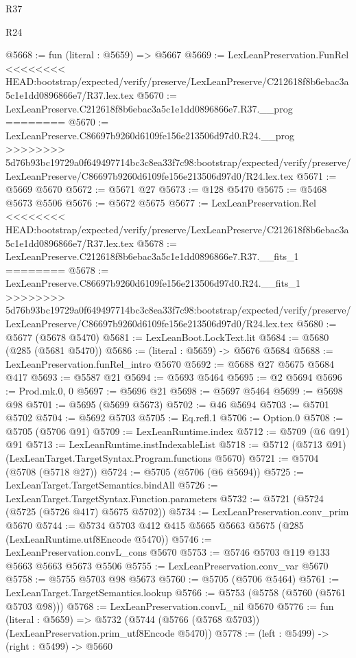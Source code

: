 \begin{lexlean}{R37}
\begin{lexlean}{R24}
\begin{coremodule}
{{{{{{{{{{{{{{{{{{{{{{{{{{{{{{{{{{{{{{{{{{{{{{{{{{{{{{{{{{{{{{{{{{{{{{{{{{{{{{{{{{{{{{{{{{{{{{{{{{{{{{{{{{{{{{{{{{{{{{{{{{{{{{{{{{{{{{{{{{{{{{{{{{{{{{{{{{{{{{{{{{{{{{{{{{{{{{{{{{{{{{{{{@5668 := fun (literal : @5659) => @5667
@5669 := LexLeanPreservation.FunRel
<<<<<<<< HEAD:bootstrap/expected/verify/preserve/LexLeanPreserve/C212618f8b6ebac3a5c1e1dd0896866e7/R37.lex.tex
@5670 := LexLeanPreserve.C212618f8b6ebac3a5c1e1dd0896866e7.R37.__prog
========
@5670 := LexLeanPreserve.C86697b9260d6109fe156e213506d97d0.R24.__prog
>>>>>>>> 5d76b93bc19729a0f649497714bc3c8ea33f7c98:bootstrap/expected/verify/preserve/LexLeanPreserve/C86697b9260d6109fe156e213506d97d0/R24.lex.tex
@5671 := @5669 @5670
@5672 := @5671 @27
@5673 := @128 @5470
@5675 := @5468 @5673 @5506
@5676 := @5672 @5675
@5677 := LexLeanPreservation.Rel
<<<<<<<< HEAD:bootstrap/expected/verify/preserve/LexLeanPreserve/C212618f8b6ebac3a5c1e1dd0896866e7/R37.lex.tex
@5678 := LexLeanPreserve.C212618f8b6ebac3a5c1e1dd0896866e7.R37.__fits_1
========
@5678 := LexLeanPreserve.C86697b9260d6109fe156e213506d97d0.R24.__fits_1
>>>>>>>> 5d76b93bc19729a0f649497714bc3c8ea33f7c98:bootstrap/expected/verify/preserve/LexLeanPreserve/C86697b9260d6109fe156e213506d97d0/R24.lex.tex
@5680 := @5677 (@5678 @5470)
@5681 := LexLeanBoot.LockText.lit
@5684 := @5680 (@285 (@5681 @5470))
@5686 := (literal : @5659) -> @5676 @5684
@5688 := LexLeanPreservation.funRel_intro @5670
@5692 := @5688 @27 @5675 @5684 @417
@5693 := @5587 @21
@5694 := @5693 @5464
@5695 := @2 @5694
@5696 := Prod.mk.{0, 0}
@5697 := @5696 @21
@5698 := @5697 @5464
@5699 := @5698 @98
@5701 := @5695 (@5699 @5673)
@5702 := @46 @5694
@5703 := @5701 @5702
@5704 := @5692 @5703
@5705 := Eq.refl.{1}
@5706 := Option.{0}
@5708 := @5705 (@5706 @91)
@5709 := LexLeanRuntime.index
@5712 := @5709 (@6 @91) @91
@5713 := LexLeanRuntime.instIndexableList
@5718 := @5712 (@5713 @91) (LexLeanTarget.TargetSyntax.Program.functions @5670)
@5721 := @5704 (@5708 (@5718 @27))
@5724 := @5705 (@5706 (@6 @5694))
@5725 := LexLeanTarget.TargetSemantics.bindAll
@5726 := LexLeanTarget.TargetSyntax.Function.parameters
@5732 := @5721 (@5724 (@5725 (@5726 @417) @5675 @5702))
@5734 := LexLeanPreservation.conv_prim @5670
@5744 := @5734 @5703 @412 @415 @5665 @5663 @5675 (@285 (LexLeanRuntime.utf8Encode @5470))
@5746 := LexLeanPreservation.convL_cons @5670
@5753 := @5746 @5703 @119 @133 @5663 @5663 @5673 @5506
@5755 := LexLeanPreservation.conv_var @5670
@5758 := @5755 @5703 @98 @5673
@5760 := @5705 (@5706 @5464)
@5761 := LexLeanTarget.TargetSemantics.lookup
@5766 := @5753 (@5758 (@5760 (@5761 @5703 @98)))
@5768 := LexLeanPreservation.convL_nil @5670
@5776 := fun (literal : @5659) =>
  @5732 (@5744 (@5766 (@5768 @5703)) (LexLeanPreservation.prim_utf8Encode @5470))
@5778 := (left : @5499) -> (right : @5499) -> @5660
}}}}}}}}}}}}}}}}}}}}}}}}}}}}}}}}}}}}}}}}}}}}}}}}}}}}}}}}}}}}}}}}}}}}}}}}}}}}}}}}}}}}}}}}}}}}}}}}}}}}}}}}}}}}}}}}}}}}}}}}}}}}}}}}}}}}}}}}}}}}}}}}}}}}}}}}}}}}}}}}}}}}}}}}}}}}}}}}}}}}}}}}}
\end{coremodule}
\end{lexlean}
\end{lexlean}
